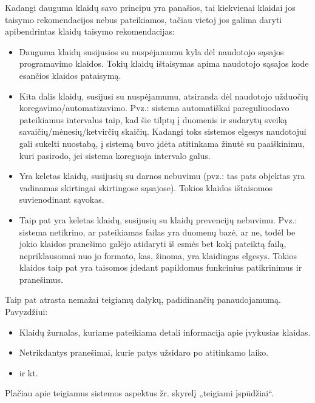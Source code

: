 Kadangi dauguma klaidų savo principu yra panašios, tai kiekvienai klaidai jos taisymo
rekomendacijos nebus pateikiamos, tačiau vietoj jos galima daryti apibendrintas klaidų
taisymo rekomendacijas:
\begin{itemize}
  \item Dauguma klaidų susijusios su nuspėjamumu kyla dėl naudotojo sąsajos
  programavimo klaidos. Tokių klaidų ištaisymas apima naudotojo sąsajos kode
  esančios klaidos pataisymą.
  \item Kita dalis klaidų, susijusi su nuspėjamumu, atsiranda dėl naudotojo užduočių
  koregavimo/automatizavimo. Pvz.: sistema automatiškai pareguliuodavo pateikiamus intervalus
  taip, kad šie tilptų į duomenis ir sudarytų sveiką savaičių/mėnesių/ketvirčių skaičių.
  Kadangi toks sistemos elgesys naudotojui gali sukelti nuostabą, į sistemą buvo
  įdėta atitinkama žinutė su paaiškinimu, kuri pasirodo, jei sistema koreguoja intervalo galus.
  \item Yra keletas klaidų, susijusių su darnos nebuvimu (pvz.: tas pats objektas yra vadinamas
  skirtingai skirtingose sąsajose). Tokios klaidos ištaisomos suvienodinant sąvokas.
  \item Taip pat yra keletas klaidų, susijusių su klaidų prevencijų nebuvimu.
  Pvz.: sistema netikrino, ar pateikiamas failas yra duomenų bazė, ar ne,
  todėl be jokio klaidos pranešimo galėjo atidaryti iš esmės bet kokį
  pateiktą failą, nepriklausomai nuo jo formato, kas, žinoma, yra klaidingas
  elgesys. Tokios klaidos taip pat yra taisomos įdedant papildomus funkcinius
  patikrinimus ir pranešimus.
\end{itemize}

\vspace{1cm}
Taip pat atrasta nemažai teigiamų dalykų, padidinančių panaudojamumą. Pavyzdžiui:
\begin{itemize}
  \item Klaidų žurnalas, kuriame pateikiama detali informacija apie įvykusias klaidas.
  \item Netrikdantys pranešimai, kurie patys užsidaro po atitinkamo laiko.
  \item ir kt.
\end{itemize}

Plačiau apie teigiamus sistemos aspektus žr. skyrelį „teigiami įspūdžiai“.

